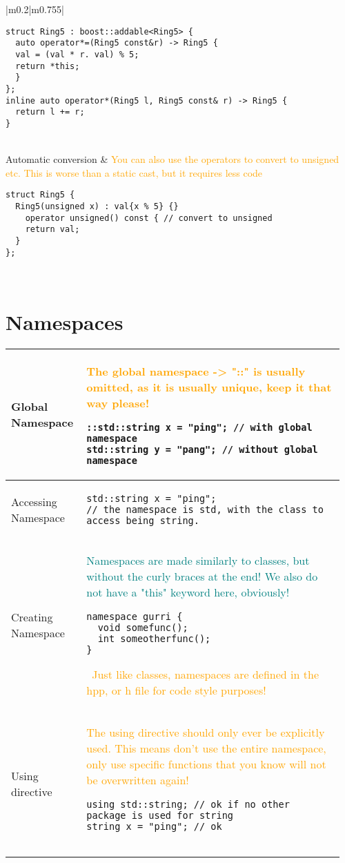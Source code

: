 \documentclass[main.tex,fontsize=8pt,paper=a4,paper=portrait,DIV=calc,]{scrartcl}
\begin{document}
\begin{table}[ht!]
\begin{tabular}{|m{0.2\linewidth}|m{0.755\linewidth}|}
\begin{lstlisting}
struct Ring5 : boost::addable<Ring5> {
  auto operator*=(Ring5 const&r) -> Ring5 {
  val = (val * r. val) % 5;
  return *this;
  }
};
inline auto operator*(Ring5 l, Ring5 const& r) -> Ring5 {
  return l += r;
}
\end{lstlisting}\\
\hline
Automatic conversion & 
\textcolor{orange}{You can also use the operators to convert to unsigned etc.\newline
This is worse than a static cast, but it requires less code}\newline
\begin{lstlisting}
struct Ring5 {
  Ring5(unsigned x) : val{x % 5} {}
    operator unsigned() const { // convert to unsigned
    return val;
  }
};
\end{lstlisting}\\
\hline
\end{tabular}
\section{Namespaces}
\begin{tabular}{|m{0.2\linewidth}|m{0.755\linewidth}|}
\hline
Global Namespace & 
\textcolor{orange}{The global namespace -> "::" is usually omitted, as it is usually unique, keep it that way please!}\newline
\begin{lstlisting}
::std::string x = "ping"; // with global namespace
std::string y = "pang"; // without global namespace
\end{lstlisting}\\
\hline
Accessing Namespace & 
\begin{lstlisting}
std::string x = "ping";
// the namespace is std, with the class to access being string.
\end{lstlisting}\\
\hline
Creating Namespace & 
\textcolor{teal}{Namespaces are made similarly to classes, but without the curly braces at the end!\newline
We also do not have a "this" keyword here, obviously!}\newline
\begin{lstlisting}
namespace gurri {
  void somefunc();
  int someotherfunc();
}
\end{lstlisting}
\, \newline
\textcolor{orange}{Just like classes, namespaces are defined in the hpp, or h file for code style purposes!}\\
\hline
Using directive & 
\textcolor{orange}{The using directive should only ever be explicitly used.\newline
This means don't use the entire namespace, only use specific functions that you know will not be overwritten again!}\newline
\begin{lstlisting}
using std::string; // ok if no other package is used for string
string x = "ping"; // ok


\end{lstlisting}
\end{tabular}
\end{table}
\end{document}
